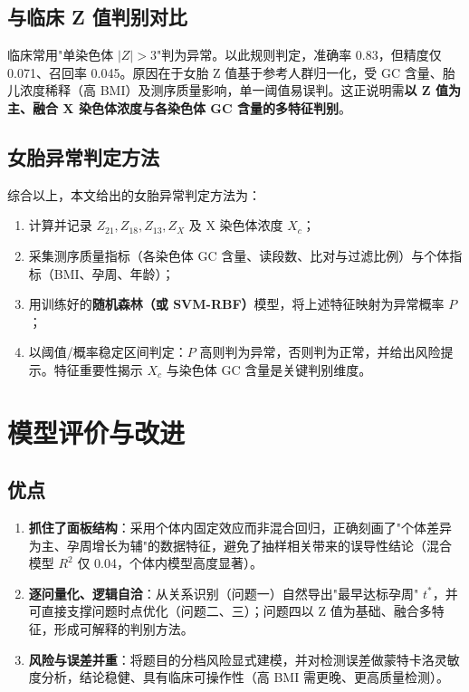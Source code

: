 \documentclass[12pt,a4paper]{article}
\begin{document}
\subsection{与临床 Z 值判别对比}
临床常用"单染色体 $|Z|>3$"判为异常。以此规则判定，准确率 0.83，但精度仅 0.071、召回率 0.045。原因在于女胎 Z 值基于参考人群归一化，受 GC 含量、胎儿浓度稀释（高 BMI）及测序质量影响，单一阈值易误判。这正说明需\textbf{以 Z 值为主、融合 X 染色体浓度与各染色体 GC 含量的多特征判别}。

\subsection{女胎异常判定方法}
综合以上，本文给出的女胎异常判定方法为：
\begin{enumerate}
\item 计算并记录 $Z_{21},Z_{18},Z_{13},Z_{X}$ 及 X 染色体浓度 $X_c$；
\item 采集测序质量指标（各染色体 GC 含量、读段数、比对与过滤比例）与个体指标（BMI、孕周、年龄）；
\item 用训练好的\textbf{随机森林（或 SVM-RBF）}模型，将上述特征映射为异常概率 $P$；
\item 以阈值/概率稳定区间判定：$P$ 高则判为异常，否则判为正常，并给出风险提示。特征重要性揭示 $X_c$ 与染色体 GC 含量是关键判别维度。
\end{enumerate}

\section{模型评价与改进}
\subsection{优点}
\begin{enumerate}
\item \textbf{抓住了面板结构}：采用个体内固定效应而非混合回归，正确刻画了"个体差异为主、孕周增长为辅"的数据特征，避免了抽样相关带来的误导性结论（混合模型 $R^2$ 仅 0.04，个体内模型高度显著）。
\item \textbf{逐问量化、逻辑自洽}：从关系识别（问题一）自然导出"最早达标孕周" $t^*$，并可直接支撑问题时点优化（问题二、三）；问题四以 Z 值为基础、融合多特征，形成可解释的判别方法。
\item \textbf{风险与误差并重}：将题目的分档风险显式建模，并对检测误差做蒙特卡洛灵敏度分析，结论稳健、具有临床可操作性（高 BMI 需更晚、更高质量检测）。
\end{enumerate}
\end{document}
